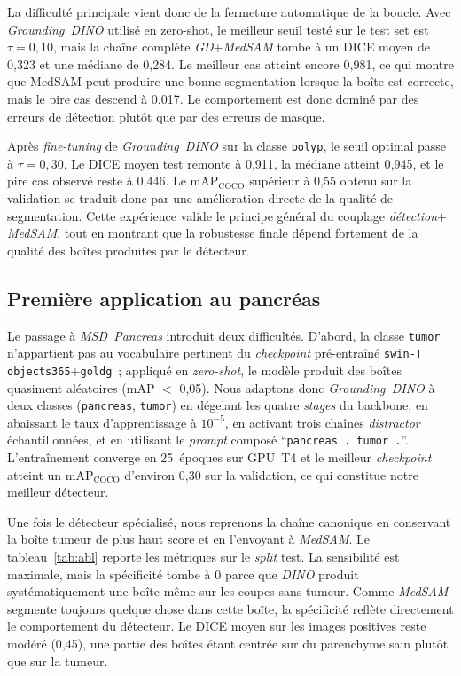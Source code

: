 \documentclass{article}
\begin{document}
La difficult\'e principale vient donc de la fermeture automatique de la boucle.
Avec \emph{Grounding~DINO} utilis\'e en zero-shot, le meilleur seuil test\'e sur
le test set est \(\tau=0{,}10\), mais la cha\^ine compl\`ete
\emph{GD$+$MedSAM} tombe \`a un DICE moyen de 0{,}323 et une m\'ediane de
0{,}284. Le meilleur cas atteint encore 0{,}981, ce qui montre que MedSAM peut
produire une bonne segmentation lorsque la bo\^ite est correcte, mais le pire
cas descend \`a 0{,}017. Le comportement est donc domin\'e par des erreurs de
d\'etection plut\^ot que par des erreurs de masque.

Apr\`es \emph{fine-tuning} de \emph{Grounding~DINO} sur la classe
\texttt{polyp}, le seuil optimal passe \`a \(\tau=0{,}30\). Le DICE moyen test
remonte \`a 0{,}911, la m\'ediane atteint 0{,}945, et le pire cas observ\'e
reste \`a 0{,}446. Le mAP\(_{\text{COCO}}\) sup\'erieur \`a 0{,}55 obtenu sur
la validation se traduit donc par une am\'elioration directe de la qualit\'e de
segmentation. Cette exp\'erience valide le principe g\'en\'eral du couplage
\emph{d\'etection$+$MedSAM}, tout en montrant que la robustesse finale d\'epend
fortement de la qualit\'e des bo\^ites produites par le d\'etecteur.

\subsection{Premi\`ere application au pancr\'eas}

Le passage \`a \emph{MSD~Pancreas} introduit deux difficult\'es. D'abord, la
classe \texttt{tumor} n'appartient pas au vocabulaire pertinent du
\emph{checkpoint} pr\'e-entra\^in\'e \texttt{swin-T objects365$+$goldg}~;
appliqu\'e en \emph{zero-shot}, le mod\`ele produit des bo\^ites quasiment
al\'eatoires (mAP $<$ 0{,}05). Nous adaptons donc \emph{Grounding~DINO}
\`a deux classes (\texttt{pancreas}, \texttt{tumor}) en d\'egelant les quatre
\emph{stages} du backbone, en abaissant le taux d'apprentissage \`a $10^{-5}$,
en activant trois cha\^ines \emph{distractor} \'echantillonn\'ees, et en
utilisant le \emph{prompt} compos\'e ``\texttt{pancreas . tumor .}''.
L'entra\^inement converge en 25~\'epoques sur GPU~T4 et le meilleur
\emph{checkpoint} atteint un mAP\(_{\text{COCO}}\) d'environ 0{,}30 sur la
validation, ce qui constitue notre meilleur d\'etecteur.

Une fois le d\'etecteur sp\'ecialis\'e, nous reprenons la cha\^ine canonique
en conservant la bo\^ite tumeur de plus haut score et en l'envoyant \`a
\emph{MedSAM}. Le tableau~\ref{tab:abl} reporte les m\'etriques sur le
\emph{split} test. La sensibilit\'e est maximale, mais la
sp\'ecificit\'e tombe \`a 0 parce que \emph{DINO} produit
syst\'ematiquement une bo\^ite m\^eme sur les coupes sans tumeur. Comme
\emph{MedSAM} segmente toujours quelque chose dans cette bo\^ite, la
sp\'ecificit\'e refl\`ete directement le comportement du d\'etecteur. Le
DICE moyen sur les images positives reste mod\'er\'e (0{,}45), une partie
des bo\^ites \'etant centr\'ee sur du parenchyme sain plut\^ot que sur la
tumeur.
\end{document}
